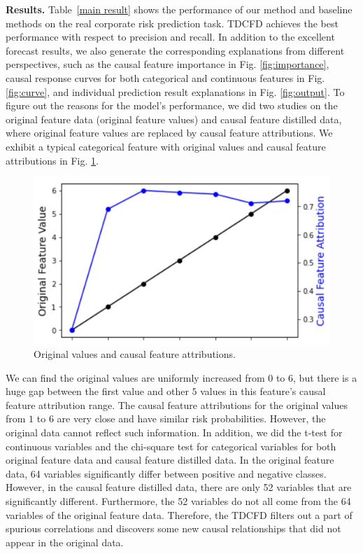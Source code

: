 \documentclass[letterpaper]{article} %
\theoremstyle{definition}
\theoremstyle{remark}
\begin{document}
\noindent\textbf{Results.} Table~\ref{main result} shows the performance of our method and baseline methods on the real corporate risk prediction task. TDCFD achieves the best performance with respect to precision and recall. In addition to the excellent forecast results, we also generate the corresponding explanations from different perspectives, such as the causal feature importance in Fig. \ref{fig:importance}, causal response curves for both categorical and continuous features in Fig. \ref{fig:curve}, and individual prediction result explanations in Fig. \ref{fig:output}. To figure out the reasons for the model's performance, we did two studies on the original feature data (original feature values) and causal feature distilled data, where original feature values are replaced by causal feature attributions. We exhibit a typical categorical feature with original values and causal feature attributions in Fig. \ref{fig:compare}. 
\begin{figure}
  \centering
  \includegraphics[width=0.7\linewidth]{compare.jpg}
 \vspace{-3mm}
  \caption{Original values and causal feature attributions.}
 \vspace{-3mm}
  \label{fig:compare}
\end{figure}
We can find the original values are uniformly increased from $0$ to $6$, but there is a huge gap between the first value and other $5$ values in this feature's causal feature attribution range. The causal feature attributions for the original values from $1$ to $6$ are very close and have similar risk probabilities. However, the original data cannot reflect such information. In addition, we did the t-test for continuous variables and the chi-square test for categorical variables for both original feature data and causal feature distilled data. In the original feature data, 64 variables significantly differ between positive and negative classes. However, in the causal feature distilled data, there are only 52 variables that are significantly different. Furthermore, the 52 variables do not all come from the 64 variables of the original feature data. Therefore, the TDCFD filters out a part of spurious correlations and discovers some new causal relationships that did not appear in the original data.
\end{document}
